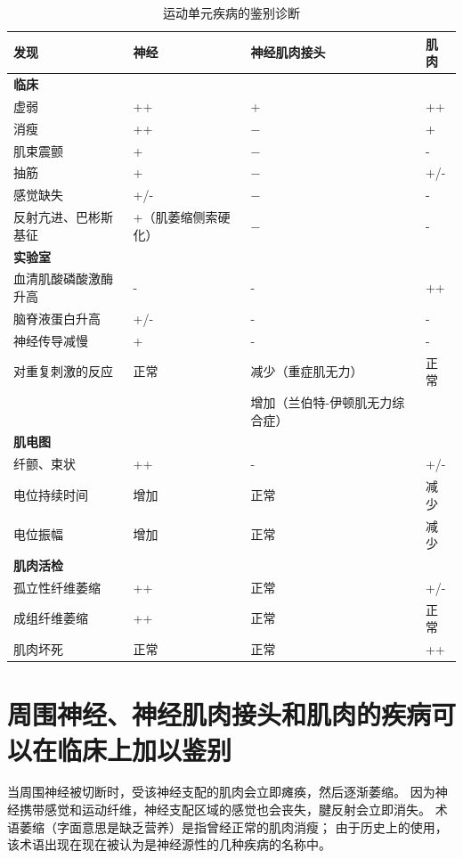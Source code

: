 \begin{table}[htbp]
	\caption{运动单元疾病的鉴别诊断} \label{tab:57_1} \centering
	\begin{tabular}{llll}
		\toprule
		发现 & 神经 & 神经肌肉接头 & 肌肉\\
		\midrule
		\textbf{临床} &  &  &  \\
		虚弱 & ++ & + & ++ \\
		消瘦 & ++ & − & + \\
		肌束震颤 & + & − & - \\
		抽筋 & + & − & +/- \\
		感觉缺失 & +/- & − & - \\
		反射亢进、巴彬斯基征 & +（肌萎缩侧索硬化） & − & - \\
		\textbf{实验室} &  &  &  \\
		血清肌酸磷酸激酶升高 & - & - & ++ \\
		脑脊液蛋白升高 & +/- & - & - \\
		神经传导减慢 & + & - & - \\
		对重复刺激的反应 & 正常 & 减少（重症肌无力） & 正常 \\
		 &  & 增加（兰伯特-伊顿肌无力综合症） &  \\
		\textbf{肌电图} &  &  &  \\
		纤颤、束状 & ++ & - & +/- \\
		电位持续时间 & 增加 & 正常 & 减少 \\
		电位振幅 & 增加 & 正常 & 减少 \\
		\textbf{肌肉活检} &  &  &  \\
		孤立性纤维萎缩 & ++ & 正常 & +/- \\
		成组纤维萎缩 & ++ & 正常 & 正常 \\
		肌肉坏死 & 正常 & 正常 & ++ \\
		\bottomrule
	\end{tabular}
\end{table}



\section{周围神经、神经肌肉接头和肌肉的疾病可以在临床上加以鉴别}

当周围神经被切断时，受该神经支配的肌肉会立即瘫痪，然后逐渐萎缩。
因为神经携带感觉和运动纤维，神经支配区域的感觉也会丧失，腱反射会立即消失。
术语萎缩（字面意思是缺乏营养）是指曾经正常的肌肉消瘦；
由于历史上的使用，该术语出现在现在被认为是神经源性的几种疾病的名称中。


